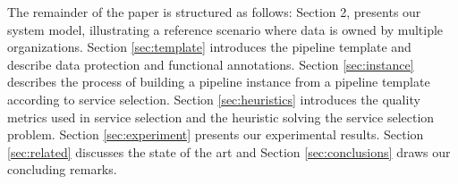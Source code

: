 The remainder of the paper is structured as follows: Section 2, presents our system model, illustrating a reference scenario where data is owned by multiple organizations. Section \ref{sec:template} introduces the pipeline template and describe data protection and functional annotations. Section \ref{sec:instance} describes the process of building a pipeline instance from a pipeline template according to service selection. Section \ref{sec:heuristics} introduces the quality metrics used in service selection and the heuristic solving the service selection problem. Section \ref{sec:experiment} presents our experimental results. Section \ref{sec:related} discusses the state of the art and Section \ref{sec:conclusions} draws our concluding remarks.